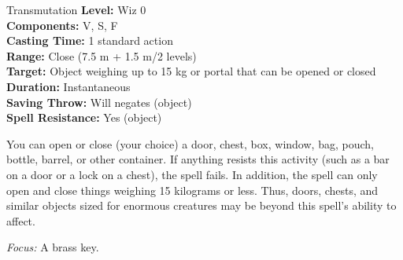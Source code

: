 {Transmutation}
{
	\textbf{Level:}
	Wiz 0\\
	\textbf{Components:}
	V, S, F\\
	\textbf{Casting Time:}
	1 standard action\\
	\textbf{Range:}
	Close (7.5 m + 1.5 m/2 levels)\\
	\textbf{Target:}
	Object weighing up to 15 kg or portal that can be opened or closed\\
	\textbf{Duration:}
	Instantaneous\\
	\textbf{Saving Throw:}
	Will negates (object)\\
	\textbf{Spell Resistance:}
	Yes (object)\\
}
{
	You can open or close (your choice) a door, chest, box, window, bag, pouch, bottle, barrel, or other container. If anything resists this activity (such as a bar on a door or a lock on a chest), the spell fails. In addition, the spell can only open and close things weighing 15 kilograms or less. Thus, doors, chests, and similar objects sized for enormous creatures may be beyond this spell's ability to affect.

	\textit{Focus:}
	A brass key.

}
